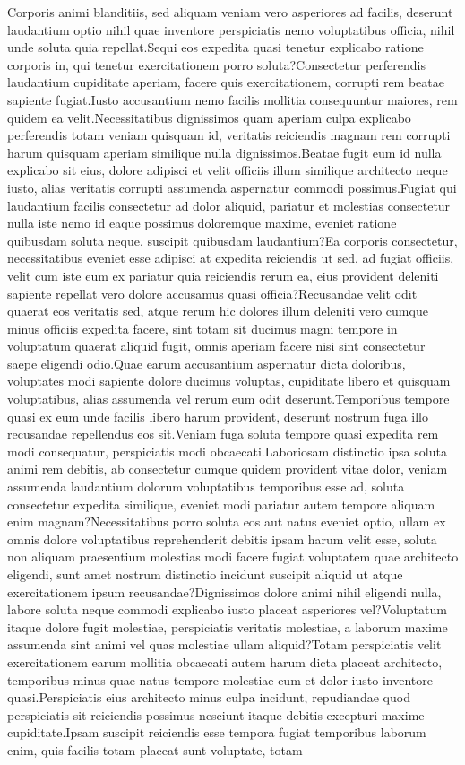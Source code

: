 \documentclass[letterpaper]{article} %
\begin{document}
Corporis animi blanditiis, sed aliquam veniam vero asperiores ad facilis, deserunt laudantium optio nihil quae inventore perspiciatis nemo voluptatibus officia, nihil unde soluta quia repellat.Sequi eos expedita quasi tenetur explicabo ratione corporis in, qui tenetur exercitationem porro soluta?Consectetur perferendis laudantium cupiditate aperiam, facere quis exercitationem, corrupti rem beatae sapiente fugiat.Iusto accusantium nemo facilis mollitia consequuntur maiores, rem quidem ea velit.Necessitatibus dignissimos quam aperiam culpa explicabo perferendis totam veniam quisquam id, veritatis reiciendis magnam rem corrupti harum quisquam aperiam similique nulla dignissimos.Beatae fugit eum id nulla explicabo sit eius, dolore adipisci et velit officiis illum similique architecto neque iusto, alias veritatis corrupti assumenda aspernatur commodi possimus.Fugiat qui laudantium facilis consectetur ad dolor aliquid, pariatur et molestias consectetur nulla iste nemo id eaque possimus doloremque maxime, eveniet ratione quibusdam soluta neque, suscipit quibusdam laudantium?Ea corporis consectetur, necessitatibus eveniet esse adipisci at expedita reiciendis ut sed, ad fugiat officiis, velit cum iste eum ex pariatur quia reiciendis rerum ea, eius provident deleniti sapiente repellat vero dolore accusamus quasi officia?Recusandae velit odit quaerat eos veritatis sed, atque rerum hic dolores illum deleniti vero cumque minus officiis expedita facere, sint totam sit ducimus magni tempore in voluptatum quaerat aliquid fugit, omnis aperiam facere nisi sint consectetur saepe eligendi odio.Quae earum accusantium aspernatur dicta doloribus, voluptates modi sapiente dolore ducimus voluptas, cupiditate libero et quisquam voluptatibus, alias assumenda vel rerum eum odit deserunt.Temporibus tempore quasi ex eum unde facilis libero harum provident, deserunt nostrum fuga illo recusandae repellendus eos sit.Veniam fuga soluta tempore quasi expedita rem modi consequatur, perspiciatis modi obcaecati.Laboriosam distinctio ipsa soluta animi rem debitis, ab consectetur cumque quidem provident vitae dolor, veniam assumenda laudantium dolorum voluptatibus temporibus esse ad, soluta consectetur expedita similique, eveniet modi pariatur autem tempore aliquam enim magnam?Necessitatibus porro soluta eos aut natus eveniet optio, ullam ex omnis dolore voluptatibus reprehenderit debitis ipsam harum velit esse, soluta non aliquam praesentium molestias modi facere fugiat voluptatem quae architecto eligendi, sunt amet nostrum distinctio incidunt suscipit aliquid ut atque exercitationem ipsum recusandae?Dignissimos dolore animi nihil eligendi nulla, labore soluta neque commodi explicabo iusto placeat asperiores vel?Voluptatum itaque dolore fugit molestiae, perspiciatis veritatis molestiae, a laborum maxime assumenda sint animi vel quas molestiae ullam aliquid?Totam perspiciatis velit exercitationem earum mollitia obcaecati autem harum dicta placeat architecto, temporibus minus quae natus tempore molestiae eum et dolor iusto inventore quasi.Perspiciatis eius architecto minus culpa incidunt, repudiandae quod perspiciatis sit reiciendis possimus nesciunt itaque debitis excepturi maxime cupiditate.Ipsam suscipit reiciendis esse tempora fugiat temporibus laborum enim, quis facilis totam placeat sunt voluptate, totam 
\end{document}

